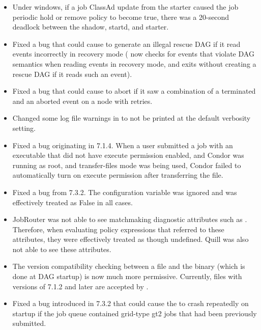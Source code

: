 \begin{itemize}

\item Under windows, if a job ClassAd update from the starter caused the
job periodic hold or remove policy to become true, there was a 20-second
deadlock between the shadow, startd, and starter.

\item Fixed a bug that could cause  to generate an
illegal rescue DAG if it read events incorrectly in recovery mode
( now checks for events that violate DAG semantics
when reading events in recovery mode, and exits without creating a
rescue DAG if it reads such an event).

\item Fixed a bug that could cause  to abort if it saw
a combination of a terminated and an aborted event on a node with
retries.

\item Changed some log file warnings in  to not be
printed at the default verbosity setting.

\item Fixed a bug originating in 7.1.4.  When a user submitted a job
with an executable that did not have execute permission enabled, and
Condor was running as root, and transfer-files mode was being used,
Condor failed to automatically turn on execute permission after
transferring the file.

\item Fixed a bug from 7.3.2.  The configuration variable
 was ignored and was effectively
treated as False in all cases.

\item JobRouter was not able to see matchmaking diagnostic attributes
such as .  Therefore, when evaluating policy
expressions that referred to these attributes, they were effectively
treated as though undefined.  Quill was also not able to see these
attributes.

\item The version compatibility checking between a 
file and the  binary (which is done at DAG startup) is
now much more permissive.  Currently,  files with
versions of 7.1.2 and later are accepted by .

\item Fixed a bug introduced in 7.3.2 that could cause the
 to crash repeatedly on startup if the job queue
contained grid-type gt2 jobs that had been previously submitted.


\end{itemize}
